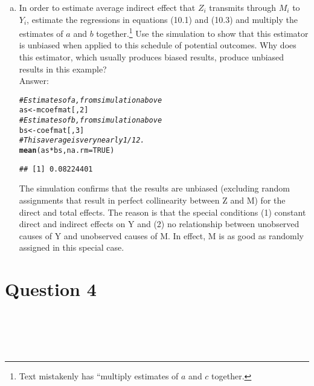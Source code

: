 \documentclass[11pt,notitlepage]{article}\usepackage[]{graphicx}\usepackage[]{color}
\makeatletter
\newcommand{\hlnum}[1]{\textcolor[rgb]{0.686,0.059,0.569}{#1}}%
\newcommand{\hlcom}[1]{\textcolor[rgb]{0.678,0.584,0.686}{\textit{#1}}}%
\newcommand{\hlopt}[1]{\textcolor[rgb]{0,0,0}{#1}}%
\newcommand{\hlstd}[1]{\textcolor[rgb]{0.345,0.345,0.345}{#1}}%
\newcommand{\hlkwb}[1]{\textcolor[rgb]{0.69,0.353,0.396}{#1}}%
\newcommand{\hlkwc}[1]{\textcolor[rgb]{0.333,0.667,0.333}{#1}}%
\newcommand{\hlkwd}[1]{\textcolor[rgb]{0.737,0.353,0.396}{\textbf{#1}}}%
\newenvironment{kframe}{%
 \def\at@end@of@kframe{}%
 \ifinner\ifhmode%
  \def\at@end@of@kframe{\end{minipage}}%
  \begin{minipage}{\columnwidth}%
 \fi\fi%
 \def\FrameCommand##1{\hskip\@totalleftmargin \hskip-\fboxsep
 \colorbox{shadecolor}{##1}\hskip-\fboxsep
     \hskip-\linewidth \hskip-\@totalleftmargin \hskip\columnwidth}%
 \MakeFramed {\advance\hsize-\width
   \@totalleftmargin\z@ \linewidth\hsize
   \@setminipage}}%
 {\par\unskip\endMakeFramed%
 \at@end@of@kframe}
\newenvironment{knitrout}{}{} %
\makeatother
\begin{document}
\begin{enumerate}[a)]
\item In order to estimate average indirect effect that $Z_i$ transmits through $M_i$ to $Y_i$, estimate the regressions in equations (10.1) and (10.3) and multiply the estimates of $a$ and $b$ together.\footnote{Text mistakenly has ``multiply estimates of $a$ and $c$ together.} Use the simulation to show that this estimator is unbiased when applied to this schedule of potential outcomes. Why does this estimator, which usually produces biased results, produce unbiased results in this example?\\
Answer:\\

\begin{knitrout}
\color{fgcolor}\begin{kframe}
\begin{alltt}
\hlcom{# Estimates of a, from simulation above}
\hlstd{as} \hlkwb{<-} \hlstd{mcoefmat[,}\hlnum{2}\hlstd{]}
\hlcom{# Estimates of b, from simulation above}
\hlstd{bs} \hlkwb{<-} \hlstd{coefmat[,}\hlnum{3}\hlstd{]}
\hlcom{# This average is very nearly 1/12.}
\hlkwd{mean}\hlstd{(as}\hlopt{*}\hlstd{bs,} \hlkwc{na.rm} \hlstd{=} \hlnum{TRUE}\hlstd{)}
\end{alltt}
\begin{verbatim}
## [1] 0.08224401
\end{verbatim}
\end{kframe}
\end{knitrout}


The simulation confirms that the results are unbiased (excluding random assignments that result in perfect collinearity between Z and M) for the direct and total effects.  The reason is that the special conditions (1) constant direct and indirect effects on Y and (2) no relationship between unobserved causes of Y and unobserved causes of M.  In effect, M is as good as randomly assigned in this special case.  

\end{enumerate}


\section*{Question 4}
\begin{knitrout}
\color{fgcolor}\begin{kframe}
\begin{verbatim}





\end{verbatim}
\end{kframe}
\end{knitrout}
\end{document}

